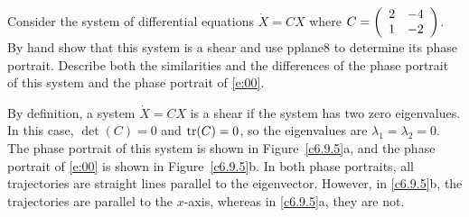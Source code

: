 \documentclass{ximera}
\begin{document}
\begin{exercise} \label{c6.9.5}
Consider the system of differential equations $\dot{X}=CX$ where
$C=\left(\begin{array}{rr} 2 & -4\\ 1 &-2\end{array}\right)$.  By hand show that this system is a shear and
use {\sf pplane8} to determine its phase portrait.  Describe both the
similarities and the differences of the phase portrait of this system
and the phase portrait of \eqref{e:00}.

\begin{solution}

By definition, a system $\dot{X} = CX$ is a shear if the system has two
zero eigenvalues.  In this case, $\det(C) = 0$ and ${\rm tr}(C) = 0$, so
the eigenvalues are $\lambda_1 = \lambda_2 = 0$.  The phase portrait of
this system is shown in Figure~\ref{c6.9.5}a, and the phase portrait of
\eqref{e:00} is shown in Figure~\ref{c6.9.5}b.  In both phase portraits,
all trajectories are straight lines parallel to the eigenvector.  However,
in \ref{c6.9.5}b, the trajectories are parallel to the $x$-axis, whereas
in \ref{c6.9.5}a, they are not.

\begin{figure}[htb]
                       \centerline{%
                       }
\end{figure}







\end{solution}
\end{exercise}
\end{document}
